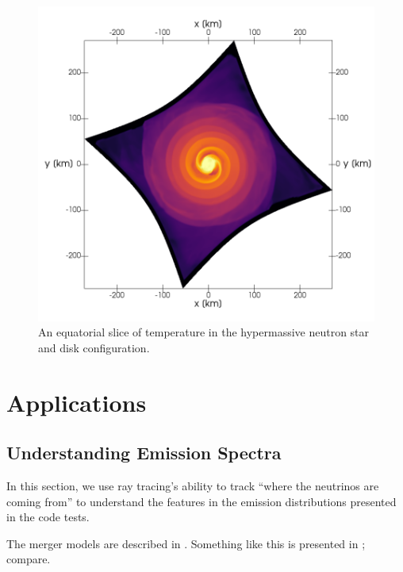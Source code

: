 \documentclass[aps,floatfix,prd,superscriptaddress,twocolumn]{revtex4-1}
\begin{document}
\begin{figure}
  \includegraphics[width=\columnwidth]{production-colormap-equat-temp}
  \caption{An equatorial slice of temperature in the hypermassive neutron
    star and disk configuration.}
  \label{fig:nsns_temp_equat}
\end{figure}

\section{Applications}
\label{sec:applications}

\subsection{Understanding Emission Spectra}
\label{ssec:spectra}
In this section, we use ray tracing's ability to track ``where the neutrinos
are coming from'' to understand the features in the emission distributions
presented in the code tests.

The merger models are described in \cite{fouc2015-m1_nsbh, fouc2016-m1_nsns}.
Something like this is presented in \cite[Figs.~10-11]{pere2014-nu_wind};
compare.
\end{document}
